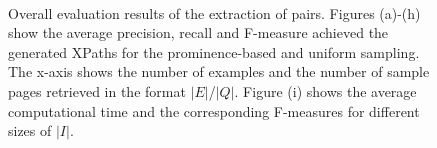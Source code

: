 \begin{figure}[h!tb]
        ~
        ~
\caption{Overall evaluation results of the extraction of pairs. Figures (a)-(h) show the average precision, recall and F-measure achieved the generated XPaths for the prominence-based and uniform sampling. The x-axis shows the number of examples and the number of sample pages retrieved in the format $|E|$/$|Q|$. Figure (i) shows the average computational time and the corresponding F-measures for different sizes of $|I|$.}
\label{charex:fig:overall-XPaths}
\end{figure}

